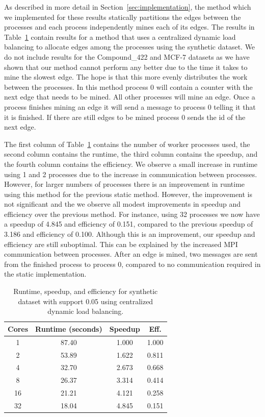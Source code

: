As described in more detail in Section~\ref{sec:implementation}, the method
which we implemented for these results statically partitions the edges between
the processes and each process independently mines each of its edges. The
results in Table~\ref{tab:synth_dyn} contain results for a method that uses a
centralized dynamic load balancing to allocate edges among the processes
using the synthetic dataset. We do not include results for the
Compound\_422 and MCF-7 datasets as we have shown that our method
cannot perform any better due to the time it takes to mine the slowest edge.
The hope is that this more evenly
distributes the work between the processes. In this method process 0 will
contain a counter with the next edge that needs to be mined. All other
processes will mine an edge. Once a process finishes mining an edge it will
send a message to process 0 telling it that it is finished. If there are still
edges to be mined process 0 sends the id of the next edge.

The first column of
Table~\ref{tab:synth_dyn} contains the number of worker processes used, the
second column contains the runtime, the third column contains the speedup, and
the fourth column contains the efficiency.  We observe a small increase in
runtime using 1 and 2 processes due to the increase in communication between
processes. However, for larger numbers of processes there is an improvement in
runtime using this method for the previous static method. However, the
improvement is not significant and the we observe all modest improvements in
speedup and efficiency over the previous method. For instance, using 32
processes we now have a speedup of 4.845 and efficiency of 0.151, compared to
the previous speedup of 3.186 and efficiency of 0.100. Although this is an
improvement, our speedup and efficiency are still suboptimal. This can be
explained by the increased MPI communication between processes. After an edge
is mined, two messages are sent from the finished process to process 0,
compared to no communication required in the static implementation.


\begin{table}[H]
\centering
\begin{tabular}{cccc}
\hline
Cores & Runtime (seconds) & Speedup &  Eff.  \\
\hline
1   &    87.40   &     1.000  &    1.000   \\ 
2   &    53.89   &     1.622  &    0.811   \\
4   &    32.70   &     2.673  &    0.668   \\
8   &    26.37   &     3.314  &    0.414   \\
16  &    21.21   &     4.121  &    0.258   \\
32  &    18.04   &     4.845  &    0.151   \\
\hline
\end{tabular}
\caption{Runtime, speedup, and efficiency for synthetic dataset with support
         0.05 using centralized dynamic load balancing.}
\label{tab:synth_dyn}
\end{table}

